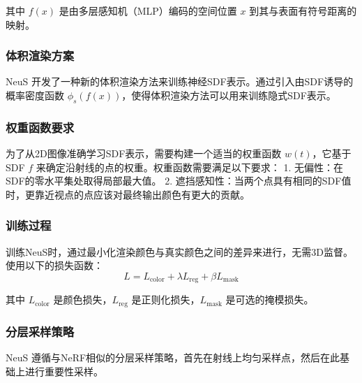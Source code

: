 \documentclass{nwputhesis}
\begin{document}
其中 \( f(x) \) 是由多层感知机（MLP）编码的空间位置 \( x \) 到其与表面有符号距离的映射。

\subsubsection{体积渲染方案}
NeuS 开发了一种新的体积渲染方法来训练神经SDF表示。通过引入由SDF诱导的概率密度函数 \( \phi_s(f(x)) \)，使得体积渲染方法可以用来训练隐式SDF表示。

\subsubsection{权重函数要求}
为了从2D图像准确学习SDF表示，需要构建一个适当的权重函数 \( w(t) \)，它基于SDF \( f \) 来确定沿射线的点的权重。权重函数需要满足以下要求：
1. 无偏性：在SDF的零水平集处取得局部最大值。
2. 遮挡感知性：当两个点具有相同的SDF值时，更靠近视点的点应该对最终输出颜色有更大的贡献。

\subsubsection{训练过程}
训练NeuS时，通过最小化渲染颜色与真实颜色之间的差异来进行，无需3D监督。使用以下的损失函数：
\[ L = L_{\text{color}} + \lambda L_{\text{reg}} + \beta L_{\text{mask}} \]


其中 \( L_{\text{color}} \) 是颜色损失，\( L_{\text{reg}} \) 是正则化损失，\( L_{\text{mask}} \) 是可选的掩模损失。

\subsubsection{分层采样策略}
NeuS 遵循与NeRF相似的分层采样策略，首先在射线上均匀采样点，然后在此基础上进行重要性采样。
\end{document}
